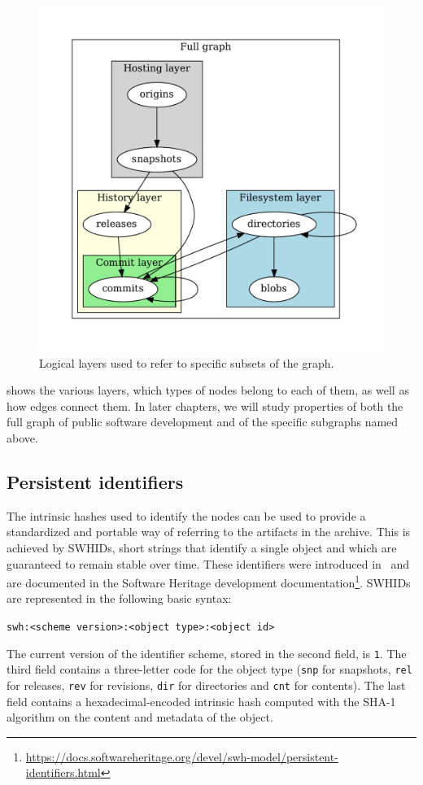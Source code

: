 \begin{figure}
    \centering
    \includegraphics[width=0.6\linewidth,trim=1cm 1cm 1cm 1cm]{img/swh-layers}
    \caption{Logical layers used to refer to specific subsets of the graph.}%
    \label{fig:layers}
\end{figure}
 shows the various layers, which types of nodes belong to
each of them, as well as how edges connect them. In later chapters, we will
study properties of both the full graph of public software development and of
the specific subgraphs named above.


\subsection{Persistent identifiers}%
\label{sec:swhid}

The intrinsic hashes used to identify the nodes can be used to provide a
standardized and portable way of referring to the artifacts in the archive. This
is achieved by \glspl{SWHID},
short strings that identify a single object and which are guaranteed to remain
stable over time.  These identifiers were introduced in~\cite{cise-2020-doi}
and are documented in the Software Heritage development
documentation\footnote{\url{https://docs.softwareheritage.org/devel/swh-model/persistent-identifiers.html}}.
\glspl{SWHID} are represented in the following basic syntax:

\texttt{swh:<scheme version>:<object type>:<object id>}

The current version of the identifier scheme, stored in the second field, is
\texttt{1}. The third field contains a three-letter code for the object type
(\texttt{snp} for snapshots, \texttt{rel} for releases, \texttt{rev} for
revisions, \texttt{dir} for directories and \texttt{cnt} for contents). The
last field contains a hexadecimal-encoded intrinsic hash computed with the
SHA-1 algorithm on the content and metadata of the object.

